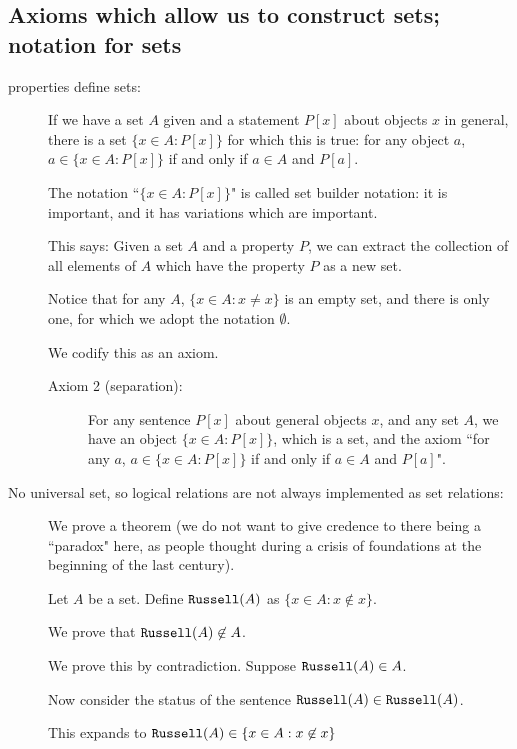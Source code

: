 \documentclass[12pt]{article}
\begin{document}
\subsection{Axioms which allow us to construct sets;  notation for sets}
\begin{description}
\item[properties define sets:]  If we have a set $A$ given and a statement $P[x]$ about objects  $x$ in general, there is a set
$\{x \in A:P[x]\}$ for which this is true:  for any object $a$, $a \in \{x \in A:P[x]\}$ if and only if $a \in A$ and $P[a]$.

The notation ``$\{x \in A:P[x]\}$" is called set builder notation:  it is important, and it has variations which are important.

This says:  Given a set $A$ and a property $P$, we can extract the collection of all elements of $A$ which have the property $P$ as a new set.

Notice that for any $A$, $\{x \in A:x \neq x\}$ is an empty set, and there is only one, for which we adopt the notation $\emptyset$.

We codify this as an axiom.

\begin{description}

\item[Axiom 2 (separation):]  For any sentence $P[x]$ about general objects $x$, and any set $A$, we have
an object $\{x \in A:P[x]\}$, which is a set, and the axiom ``for any $a$, $a \in \{x \in A:P[x]\}$ if and only if $a \in A$ and $P[a]$".

\end{description}

\item[No universal set, so logical relations are not always implemented as set relations:]

We prove a theorem (we do not want to give credence to there being a ``paradox" here, as people thought during a crisis of foundations at the beginning of the last century).

Let $A$ be a set.  Define ${\tt Russell}(A)$ as $\{x \in A:x \not\in x\}$.

We prove that ${\tt Russell}(A)\not\in A$.

We prove this by contradiction.  Suppose ${\tt Russell}(A)\in A$.  

Now consider the status of the sentence ${\tt Russell}(A) \in {\tt Russell}(A)$.

This expands to ${\tt Russell}(A) \in \{x \in A:x \not\in x\}$


\end{description}
\end{document}
